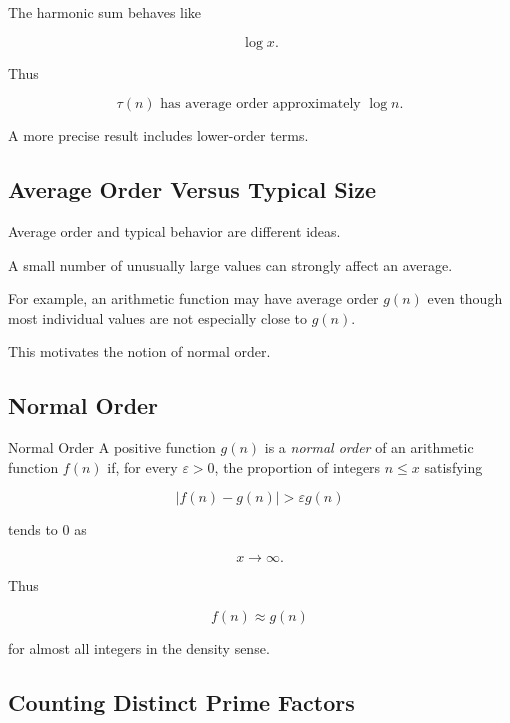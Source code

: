 The harmonic sum behaves like

\[ \log x. \]

Thus

\[ \boxed{\tau(n)\text{ has average order approximately }\log n.} \]

A more precise result includes lower-order terms.

\subsection{Average Order Versus Typical Size}
\label{subsec:average-versus-typical}

Average order and typical behavior are different ideas.

A small number of unusually large values can strongly affect an average.

For example, an arithmetic function may have average order \(g(n)\) even
though most individual values are not especially close to \(g(n)\).

This motivates the notion of normal order.

\subsection{Normal Order}
\label{subsec:normal-order}

\begin{definitionbox}{Normal Order}
A positive function \(g(n)\) is a \emph{normal order} of an arithmetic
function \(f(n)\) if, for every \(\varepsilon>0\), the proportion of integers
\(n\leq x\) satisfying

\[ |f(n)-g(n)|>\varepsilon g(n) \]

tends to \(0\) as

\[ x\to\infty. \]
\end{definitionbox}

Thus

\[ f(n)\approx g(n) \]

for almost all integers in the density sense.

\subsection{Counting Distinct Prime Factors}
\label{subsec:omega-distinct-prime-factors}


